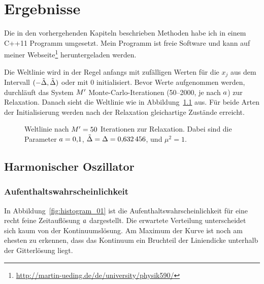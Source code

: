 \chapter{Ergebnisse}

Die in den vorhergehenden Kapiteln beschrieben Methoden habe ich in einem C++11
Programm umgesetzt. Mein Programm ist freie Software und kann auf meiner
Webseite\footnote{\url{http://martin-ueding.de/de/university/physik590/}}
heruntergeladen werden.

Die Weltlinie wird in der Regel anfangs mit zufälligen Werten für die $x_j$ aus
dem Intervall $(-\tilde \Delta, \tilde \Delta)$ oder mit 0
initialisiert. Bevor Werte aufgenommen werden, durchläuft das System
$M'$ Monte-Carlo-Iterationen (\numrange{50}{2000}, je nach
$a$) zur Relaxation. Danach sieht die Weltlinie wie in
Abbildung~\ref{fig:relaxiert} aus. Für beide Arten der Initialisierung werden
nach der Relaxation gleichartige Zustände erreicht.

\begin{figure}[htbp]
    \centering
    \caption{%
        Weltlinie nach $M' = \num{50}$ Iterationen zur Relaxation.
        Dabei sind die Parameter $a = \num{0.1}$, $\tilde \Delta
        = \Delta = \num{0.632456}$, und $\mu^2 = \num{1}$.
    }
    \label{fig:relaxiert}
\end{figure}

\section{Harmonischer Oszillator}

\subsection{Aufenthaltswahrscheinlichkeit}


In Abbildung~\ref{fig:histogram_01} ist die Aufenthaltswahrscheinlichkeit für
eine recht feine Zeitauflösung $a$ dargestellt. Die erwartete
Verteilung unterscheidet sich kaum von der Kontinuumslösung. Am Maximum der
Kurve ist noch am ehesten zu erkennen, dass das Kontinuum ein Bruchteil der
Liniendicke unterhalb der Gitterlösung liegt.

